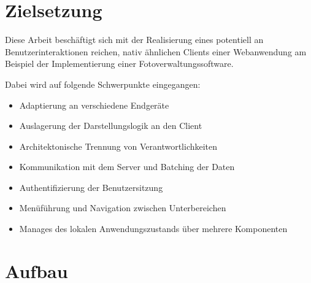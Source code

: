 \newpage

\section{Zielsetzung}
\label{sec:zielsetzung}


Diese Arbeit beschäftigt sich mit der Realisierung eines potentiell an Benutzerinteraktionen reichen, nativ ähnlichen Clients einer Webanwendung am Beispiel der Implementierung einer Fotoverwaltungssoftware.

Dabei wird auf folgende Schwerpunkte eingegangen:
\begin{itemize}
\item Adaptierung an verschiedene Endgeräte
\item Auslagerung der Darstellungslogik an den Client
\item Architektonische Trennung von Verantwortlichkeiten
\item Kommunikation mit dem Server und Batching der Daten
\item Authentifizierung der Benutzersitzung
\item Menüführung und Navigation zwischen Unterbereichen
\item Manages des lokalen Anwendungszustands über mehrere Komponenten
\end{itemize}


\section{Aufbau}

\newpage
